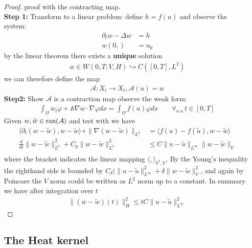 \begin{proof}
	proof with the contracting map. \\
	\textbf{Step 1:} Transform to a linear problem: define $h = f(u)$ and observe the system:
	\begin{align*}
		\partial_t w - \Delta w &= h\\
		w(0, ) &= u_0
	\end{align*}
	by the linear theorem there exists a \textbf{unique} solution 
	\begin{align*}
		w \in W(0, T; V, H) \hookrightarrow C([0, T], L^2)
	\end{align*}
	we can therefore define the map
	\begin{align*}
		\mathcal{A}: X_t \rightarrow X_t , \mathcal{A}(u) = w
	\end{align*}
	\textbf{Step2:} Show $\mathcal{A}$ is a contraction map
	observe the weak form:
	\begin{align*}
		\int_\Omega w_t \varphi + \mathbb{A} \nabla w \cdot \nabla \varphi dx = \int_\Omega f(u) \varphi dx \qquad \forall_{a.a.} t \in [0, T]
	\end{align*}
	Given $w, \tilde{w} \in \operatorname{ran}(\mathcal{A})$ and test with we have
	\begin{align*}
		\langle \partial_t(w - \tilde{w}), w - \tilde{w} \rangle 
		+ \|\nabla (w - \tilde{w})\|_{L^2} 
		&= \langle f(u) - f(\tilde{u}), w - \tilde{w} \rangle\\
		\frac{d}{dt}\|w - \tilde{w}\|_{L^2}^2 + C_p \|w - \tilde{w}\|_{L^2}^2 
		&\le C \|u - \tilde{u}\|_{L^\infty} \|w - \tilde{w}\|_V\\
	\end{align*}
	where the bracket indicates the linear mapping $\langle , \rangle_{V^*, V}$. By the Young's inequality the righthand side is bounded by 
	$C_\delta( \|u - \tilde{u}\|_{L^\infty}^2 + \delta \|w - \tilde{w}\|^2_{V}$, and again by Poincare the $V$ norm could be written as $L^2$ norm up to a constant. In summary we have after integration over $t$
	\begin{align*}
		\|(w - \tilde{w})(t)\|_H^2 \le t C \|u - \tilde{u}\|_{L^\infty}^2
	\end{align*}
\end{proof}





\subsection{The Heat kernel}



